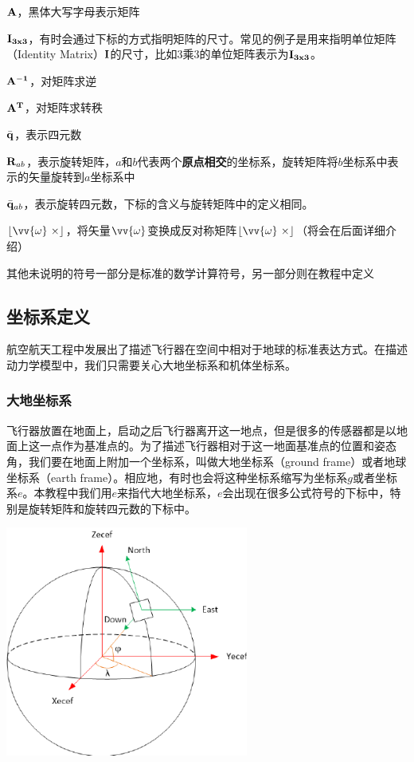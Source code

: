 \documentclass[11pt]{article}
\begin{document}
$\bf{A}$，黑体大写字母表示矩阵

$\bf{I}_{3x3}$，有时会通过下标的方式指明矩阵的尺寸。常见的例子是用来指明单位矩阵（Identity Matrix）$\bf{I}$的尺寸，比如3乘3的单位矩阵表示为$\bf{I}_{3x3}$。

$\bf{A}^{-1}$，对矩阵求逆

$\bf{A}^T$，对矩阵求转秩

$\bar{\bf{q}}$，表示四元数

${\bf R}_{ab}$，表示旋转矩阵，$a$和$b$代表两个\textbf{原点相交}的坐标系，旋转矩阵将$b$坐标系中表示的矢量旋转到$a$坐标系中

$\bar{\bf{q}}_{ab}$，表示旋转四元数，下标的含义与旋转矩阵中的定义相同。

$\lfloor \vv{\omega} \ \times \rfloor$，将矢量$\vv{\omega}$变换成反对称矩阵$\lfloor \vv{\omega} \ \times \rfloor$（将会在后面详细介绍）

其他未说明的符号一部分是标准的数学计算符号，另一部分则在教程中定义
\subsection{坐标系定义}
航空航天工程中发展出了描述飞行器在空间中相对于地球的标准表达方式。在描述动力学模型中，我们只需要关心大地坐标系和机体坐标系。
\subsubsection{大地坐标系}
飞行器放置在地面上，启动之后飞行器离开这一地点，但是很多的传感器都是以地面上这一点作为基准点的。为了描述飞行器相对于这一地面基准点的位置和姿态角，我们要在地面上附加一个坐标系，叫做大地坐标系（ground frame）或者地球坐标系（earth frame）。相应地，有时也会将这种坐标系缩写为坐标系$g$或者坐标系$e$。本教程中我们用$e$来指代大地坐标系，$e$会出现在很多公式符号的下标中，特别是旋转矩阵和旋转四元数的下标中。

\begin{center}
\includegraphics[width=0.6\textwidth]{images/ned.png}
\end{center}
\end{document}
